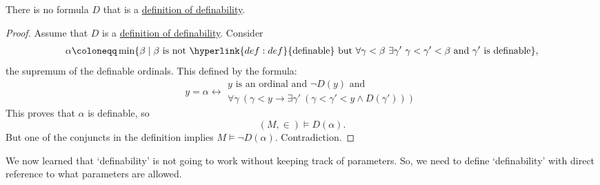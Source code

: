 \documentclass{article}
\newcommand{\named}[1]{\textbf{#1}\index{#1}}
\newcommand{\1}{\mathbbm{1}}
\let\models\vDash
\begin{document}
\begin{thm}
  There is no formula $D$ that is a \hyperlink{def:dd}{definition of definability}.
\end{thm}
\begin{proof}
  Assume that $D$ is a \hyperlink{def:dd}{definition of definability}. Consider
  \begin{align*}
  \alpha \coloneqq \min\{\beta \mid \beta \text{ is not }\hyperlink{def:def}{\text{definable}}\text{ but } \forall \gamma < \beta \ \exists \gamma'\ \gamma < \gamma' < \beta \text{ and } \gamma' \text{ is definable} \},
  \end{align*}
  the supremum of the definable ordinals. This defined by the formula:
  \begin{equation*}
    y = \alpha \longleftrightarrow
    \begin{gathered}
    y \text{ is an ordinal and } \neg D(y) \text{ and }  \\
    \forall \gamma\ (\gamma < y \rightarrow \exists \gamma'\ (\gamma < \gamma' < y \land D(\gamma')))
    \end{gathered}
  \end{equation*}
  This proves that $\alpha$ is definable, so
  \begin{equation*}
    (M,\in) \models D(\alpha).
  \end{equation*}
  But one of the conjuncts in the definition implies $M \models \neg D(\alpha)$. Contradiction.
\end{proof}

We now learned that `definability' is not going to work without keeping track of parameters. So, we need to define `definability' with direct reference to what parameters are allowed.
\end{document}
